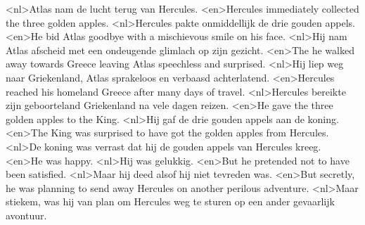<nl>Atlas nam de lucht terug van Hercules.
<en>Hercules immediately collected the three golden apples.
<nl>Hercules pakte onmiddellijk de drie gouden appels.
<en>He bid Atlas goodbye with a mischievous smile on his face.
<nl>Hij nam Atlas afscheid met een ondeugende glimlach op zijn gezicht.
<en>The he walked away towards Greece leaving Atlas speechless and surprised.
<nl>Hij liep weg naar Griekenland,  Atlas sprakeloos en verbaasd achterlatend.
<en>Hercules reached his homeland Greece after many days of travel.
<nl>Hercules bereikte zijn geboorteland Griekenland na vele dagen reizen.
<en>He gave the three golden apples to the King.
<nl>Hij gaf de drie gouden appels aan de koning.
<en>The King was surprised to have got the golden apples from Hercules.
<nl>De koning was verrast dat hij de gouden appels van Hercules kreeg.
<en>He was happy.
<nl>Hij was gelukkig.
<en>But he pretended not to have been satisfied.
<nl>Maar hij deed alsof hij niet tevreden was.
<en>But secretly, he was planning to send away Hercules on another perilous adventure.
<nl>Maar stiekem,  was hij van plan om Hercules weg te sturen op een ander gevaarlijk avontuur.
